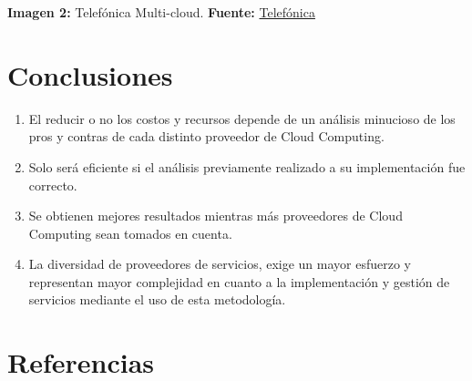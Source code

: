 \documentclass[12pt,spanish,Letterpaper,openany]{book}
\newcommand{\spaceminusmilis}{\vspace{-0.5mm}}
\begin{document}


\textbf{Imagen 2:} Telefónica Multi-cloud. \textbf{Fuente:} \href{https://comunidad.movistar.es/}{Telefónica}


\hypertarget{conclusiones-13}{%
\section*{Conclusiones}\label{conclusiones-13}}

\begin{enumerate}
\def\labelenumi{\arabic{enumi}.}
\item
  El reducir o no los costos y recursos depende de un análisis minucioso de los pros y contras de cada distinto proveedor de Cloud Computing.
\item
  Solo será eficiente si el análisis previamente realizado a su implementación fue correcto.
\item
  Se obtienen mejores resultados mientras más proveedores de Cloud Computing sean tomados en cuenta.
\item
  La diversidad de proveedores de servicios, exige un mayor esfuerzo y representan mayor complejidad en cuanto a la implementación y gestión de servicios mediante el uso de esta metodología.
\end{enumerate}

\spaceminusmilis

\hypertarget{referencias-13}{%
\section*{Referencias}\label{referencias-13}}
\end{document}
